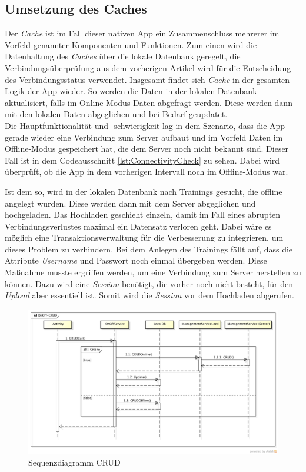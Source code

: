 \subsection{Umsetzung des Caches}
\label{ssec:nat-cache}
Der \textit{Cache} ist im Fall dieser nativen App ein Zusammenschluss mehrerer im Vorfeld genannter Komponenten und Funktionen. Zum einen wird die Datenhaltung des \textit{Caches} über die lokale Datenbank geregelt, die Verbindungsüberprüfung aus dem vorherigen Artikel wird für die Entscheidung des Verbindungsstatus verwendet. Insgesamt findet sich \textit{Cache} in der gesamten Logik der App wieder. So werden die Daten in der lokalen Datenbank aktualisiert, falls im Online-Modus Daten abgefragt werden. Diese werden dann mit den lokalen Daten abgeglichen und bei Bedarf geupdatet.\\
Die Hauptfunktionalität und -schwierigkeit lag in dem Szenario, dass die App gerade wieder eine Verbindung zum Server aufbaut und im Vorfeld Daten im Offline-Modus gespeichert hat, die dem Server noch nicht bekannt sind. Dieser Fall ist in dem Codeausschnitt \ref{lst:ConnectivityCheck} zu sehen. Dabei wird überprüft, ob die App in dem vorherigen Intervall noch im Offline-Modus war. 

Ist dem so, wird in der lokalen Datenbank nach Trainings gesucht, die offline angelegt wurden. Diese werden dann mit dem Server abgeglichen und hochgeladen. Das Hochladen geschieht einzeln, damit im Fall eines abrupten Verbindungsverlustes maximal ein Datensatz verloren geht. Dabei wäre es möglich eine Transaktionsverwaltung für die Verbesserung zu integrieren, um dieses Problem zu verhindern. Bei dem Anlegen des Trainings fällt auf, dass die Attribute \textit{Username} und Passwort noch einmal übergeben werden. Diese Maßnahme musste ergriffen werden, um eine Verbindung zum Server herstellen zu können. Dazu wird eine \textit{Session} benötigt, die vorher noch nicht besteht, für den \textit{Upload} aber essentiell ist. Somit wird die \textit{Session} vor dem Hochladen abgerufen.

\begin{figure}[h]
\centering
\includegraphics[width=\linewidth]{content/images/fITNat-OnOff-CRUD}
\caption{Sequenzdiagramm CRUD}
\label{pic:nat-CRUD}
\end{figure}